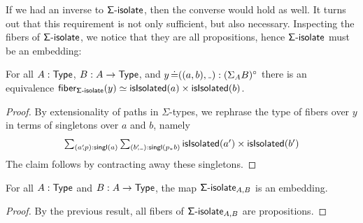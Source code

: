 If we had an inverse to \( \operatorname{\mathsf{\Sigma-isolate}} \), then the converse would hold as well.
It turns out that this requirement is not only sufficient, but also necessary.
Inspecting the fibers of \( \operatorname{\mathsf{\Sigma-isolate}} \), we notice that they are all propositions,
hence \( \operatorname{\mathsf{\Sigma-isolate}} \) must be an embedding:
\begin{lemma}\label{sigma-isolate-fibers}
  For all \( A : \operatorname{\mathsf{Type}} \), \( B : A \to \operatorname{\mathsf{Type}} \), and \( y \JudgeEq ((a, b), \Blank) : \Isolated{(\Sigma_{A} B)} \)
  there is an equivalence \( \mathsf{fiber}_{\operatorname{\mathsf{\Sigma-isolate}}}(y) \simeq \operatorname{\mathsf{isIsolated}}(a) \times \operatorname{\mathsf{isIsolated}}(b) \).
  \begin{proof}
    By extensionality of paths in \( \Sigma \)-types, we rephrase the type of fibers over \( y \) in terms of singletons
    over \( a \) and \( b \), namely
    \[
        \textstyle
        \sum_{(a'\negthickspace, p) : \Singl(a)}
        \sum_{(b'\negthickspace, \Blank) : \Singl(p_{*}{b})}
          \IsIsolated(a') \times \IsIsolated(b')
    \]
    The claim follows by contracting away these singletons.
  \end{proof}
\end{lemma}
\begin{proposition}\label{is-embedding-sigma-isolate}
  For all \( A : \operatorname{\mathsf{Type}} \) and \( B : A \to \operatorname{\mathsf{Type}} \), the map \( \operatorname{\mathsf{\Sigma-isolate}}_{A, B} \) is an embedding.
  \begin{proof}
    By the previous result, all fibers of \( \operatorname{\mathsf{\Sigma-isolate}}_{A, B} \) are propositions.
  \end{proof}
\end{proposition}

